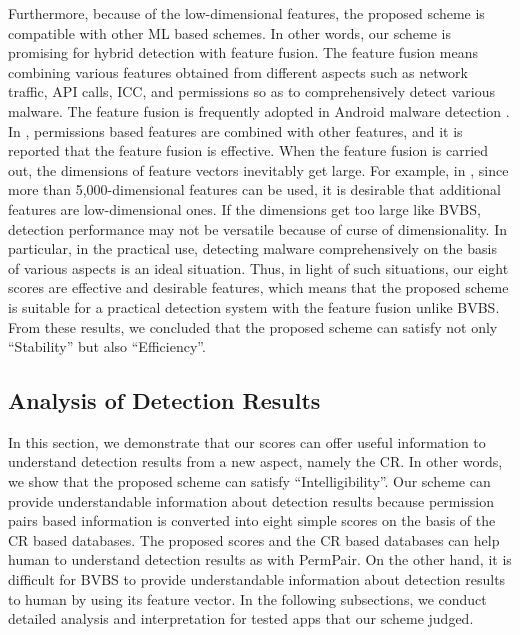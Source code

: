 \documentclass{ieeeaccess}
\begin{document}
Furthermore, because of the low-dimensional features, the proposed scheme is compatible with other ML based schemes.
In other words, our scheme is promising for hybrid detection with feature fusion.
The feature fusion means combining various features obtained from different aspects such as network traffic, API calls, ICC, and permissions so as to comprehensively detect various malware.
The feature fusion is frequently adopted in Android malware detection \cite{saracino2016madam, tao2017malpat, cai2018droidcat, arora2018ntpdroid}.
In \cite{saracino2016madam, arora2018ntpdroid}, permissions based features are combined with other features, and it is reported that the feature fusion is effective.
When the feature fusion is carried out, the dimensions of feature vectors inevitably get large.
For example, in \cite{xu2016iccdetector}, since more than 5,000-dimensional features can be used, it is desirable that additional features are low-dimensional ones.
If the dimensions get too large like BVBS, detection performance may not be versatile because of curse of dimensionality.
In particular, in the practical use, detecting malware comprehensively on the basis of various aspects is an ideal situation.
Thus, in light of such situations, our eight scores are effective and desirable features, which means that the proposed scheme is suitable for a practical detection system with the feature fusion unlike BVBS.
From these results, we concluded that the proposed scheme can satisfy not only ``Stability'' but also ``Efficiency''.

\subsection{Analysis of Detection Results} \label{subsec:analysis}
In this section, we demonstrate that our scores can offer useful information to understand detection results from a new aspect, namely the CR.
In other words, we show that the proposed scheme can satisfy ``Intelligibility''.
Our scheme can provide understandable information about detection results because permission pairs based information is converted into eight simple scores on the basis of the CR based databases.
The proposed scores and the CR based databases can help human to understand detection results as with PermPair.
On the other hand, it is difficult for BVBS to provide understandable information about detection results to human by using its feature vector.
In the following subsections, we conduct detailed analysis and interpretation for tested apps that our scheme judged.
\end{document}

